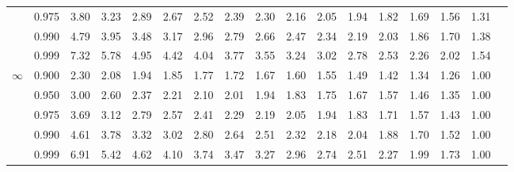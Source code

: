 {\begin{center}
\begin{tabular}{rrr@{\,}r@{\,}r@{\,}r@{\,}r@{\,}r@{\,}r@{\,}r
                   @{\,}r@{\,}r@{\,}r@{\,}r@{\,}r@{\,}r@{\,}r}
  &0.975&3.80&3.23&2.89&2.67&2.52&2.39&2.30&2.16&2.05&1.94&1.82&1.69&1.56&1.31\\
  &0.990&4.79&3.95&3.48&3.17&2.96&2.79&2.66&2.47&2.34&2.19&2.03&1.86&1.70&1.38\\
  &0.999&7.32&5.78&4.95&4.42&4.04&3.77&3.55&3.24&3.02&2.78&2.53&2.26&2.02&1.54\\
$\infty$
  &0.900&2.30&2.08&1.94&1.85&1.77&1.72&1.67&1.60&1.55&1.49&1.42&1.34&1.26&1.00\\
  &0.950&3.00&2.60&2.37&2.21&2.10&2.01&1.94&1.83&1.75&1.67&1.57&1.46&1.35&1.00\\
  &0.975&3.69&3.12&2.79&2.57&2.41&2.29&2.19&2.05&1.94&1.83&1.71&1.57&1.43&1.00\\
  &0.990&4.61&3.78&3.32&3.02&2.80&2.64&2.51&2.32&2.18&2.04&1.88&1.70&1.52&1.00\\
  &0.999&6.91&5.42&4.62&4.10&3.74&3.47&3.27&2.96&2.74&2.51&2.27&1.99&1.73&1.00
\end{tabular}
\end{center}
}